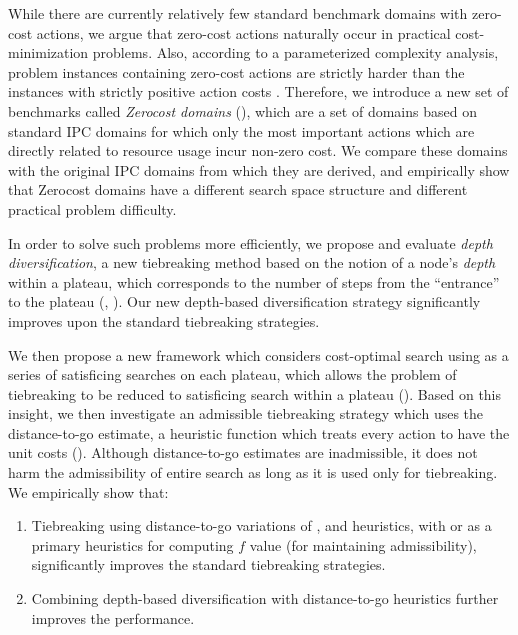 While there are currently relatively few standard benchmark domains with zero-cost actions,
we argue that zero-cost actions naturally occur in
practical cost-minimization problems.
Also, according to a parameterized complexity analysis, problem instances containing zero-cost actions are strictly harder than the instances with strictly positive action costs \cite{aghighi2015}.
Therefore, we introduce a new set of benchmarks called \emph{Zerocost domains}
(), which are a set of domains based on standard IPC domains for which only the most important actions which are directly related to resource usage incur non-zero cost.
We compare these domains with the original IPC domains from which they are derived, and empirically show that 
Zerocost domains have a different search space structure and different practical problem difficulty.

In order to solve such problems more efficiently, we propose and
evaluate \emph{depth diversification}, a new
tiebreaking method based on the notion of a node's \emph{depth} within a plateau,
which corresponds to the number of steps from the ``entrance'' to
the plateau (,
). 
Our new depth-based diversification strategy significantly improves upon the 
standard tiebreaking strategies.

We then propose a new framework which considers cost-optimal search using \astar 
as a series of satisficing searches on each plateau,
which allows the problem of tiebreaking to be reduced to satisficing search within a plateau ().
Based on this insight, we then investigate an
admissible tiebreaking strategy which uses the distance-to-go estimate, a heuristic function which treats every action
to have the unit costs ().
Although distance-to-go estimates are inadmissible,
it does not harm the admissibility of entire search as long as it is used only for tiebreaking.
% 
We empirically show that:
\begin{enumerate}
 \item Tiebreaking using distance-to-go variations of \lmcut, \mands and \ff heuristics,
       with \lmcut or \mands as a primary heuristics for computing $f$ value (for maintaining admissibility),
       significantly improves the standard tiebreaking strategies.
 \item Combining depth-based diversification with distance-to-go heuristics 
       further improves the performance.
\end{enumerate}

